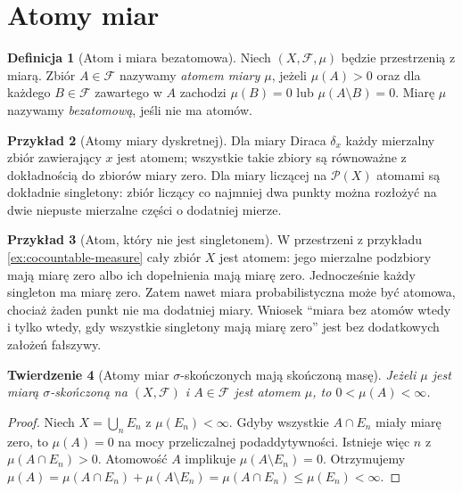 \documentclass[11pt,a4paper,oneside]{book}
\numberwithin{equation}{chapter}
\theoremstyle{plain}
\newtheorem{twierdzenie}{Twierdzenie}[chapter]
\theoremstyle{definition}
\newtheorem{definicja}[twierdzenie]{Definicja}
\newtheorem{przyklad}[twierdzenie]{Przykład}
\theoremstyle{remark}
\begin{document}
\section{Atomy miar}
\label{sec:atoms}

\begin{definicja}[Atom i miara bezatomowa]
\label{def:atom}
Niech $(X,\mathcal F,\mu)$ będzie przestrzenią z miarą.
Zbiór $A\in\mathcal F$ nazywamy \emph{atomem miary $\mu$},
jeżeli $\mu(A)>0$ oraz dla każdego $B\in\mathcal F$
zawartego w $A$ zachodzi $\mu(B)=0$ lub
$\mu(A\setminus B)=0$.
Miarę $\mu$ nazywamy \emph{bezatomową}, jeśli nie ma atomów.
\end{definicja}

\begin{przyklad}[Atomy miary dyskretnej]
Dla miary Diraca $\delta_x$ każdy mierzalny zbiór
zawierający $x$ jest atomem; wszystkie takie zbiory
są równoważne z dokładnością do zbiorów miary zero.
Dla miary liczącej na $\mathcal P(X)$ atomami są
dokładnie singletony: zbiór liczący co najmniej dwa punkty
można rozłożyć na dwie niepuste mierzalne części
o dodatniej mierze.
\end{przyklad}

\begin{przyklad}[Atom, który nie jest singletonem]
W przestrzeni z przykładu \ref{ex:cocountable-measure}
cały zbiór $X$ jest atomem: jego mierzalne podzbiory
mają miarę zero albo ich dopełnienia mają miarę zero.
Jednocześnie każdy singleton ma miarę zero.
Zatem nawet miara probabilistyczna może być atomowa,
chociaż żaden punkt nie ma dodatniej miary. Wniosek
``miara bez atomów wtedy i tylko wtedy, gdy wszystkie
singletony mają miarę zero'' jest bez dodatkowych
założeń fałszywy.
\end{przyklad}

\begin{twierdzenie}[Atomy miar $\sigma$-skończonych mają skończoną masę]
\label{thm:atom-sigma-finite}
Jeżeli $\mu$ jest miarą $\sigma$-skończoną na
$(X,\mathcal F)$ i $A\in\mathcal F$ jest atomem $\mu$,
to $0<\mu(A)<\infty$.
\end{twierdzenie}
\begin{proof}
Niech $X=\bigcup_nE_n$ z $\mu(E_n)<\infty$.
Gdyby wszystkie $A\cap E_n$ miały miarę zero,
to $\mu(A)=0$ na mocy przeliczalnej podaddytywności.
Istnieje więc $n$ z $\mu(A\cap E_n)>0$.
Atomowość $A$ implikuje $\mu(A\setminus E_n)=0$.
Otrzymujemy
$\mu(A)=\mu(A\cap E_n)+\mu(A\setminus E_n)
=\mu(A\cap E_n)\leq\mu(E_n)<\infty$.
\end{proof}
\end{document}
